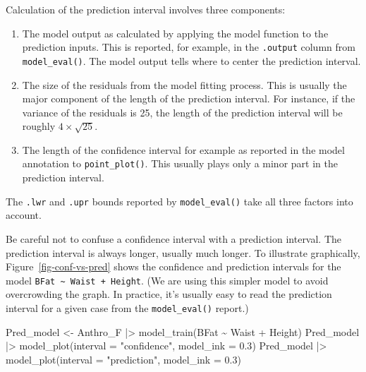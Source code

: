 \documentclass[
  letterpaper,
  DIV=11,
  numbers=noendperiod,
  oneside]{scrartcl}
\newenvironment{Shaded}{\begin{snugshade}}{\end{snugshade}}
\newcommand{\AttributeTok}[1]{\textcolor[rgb]{0.40,0.45,0.13}{#1}}
\newcommand{\FloatTok}[1]{\textcolor[rgb]{0.68,0.00,0.00}{#1}}
\newcommand{\FunctionTok}[1]{\textcolor[rgb]{0.28,0.35,0.67}{#1}}
\newcommand{\NormalTok}[1]{\textcolor[rgb]{0.00,0.23,0.31}{#1}}
\newcommand{\OtherTok}[1]{\textcolor[rgb]{0.00,0.23,0.31}{#1}}
\newcommand{\SpecialCharTok}[1]{\textcolor[rgb]{0.37,0.37,0.37}{#1}}
\newcommand{\StringTok}[1]{\textcolor[rgb]{0.13,0.47,0.30}{#1}}
\providecommand{\tightlist}{%
  \setlength{\itemsep}{0pt}\setlength{\parskip}{0pt}}\usepackage{longtable,booktabs,array}
\begin{document}
Calculation of the prediction interval involves three components:

\begin{enumerate}
\def\labelenumi{\arabic{enumi}.}
\tightlist
\item
  The model output as calculated by applying the model function to the
  prediction inputs. This is reported, for example, in the
  \texttt{.output} column from \texttt{model\_eval()}. The model output
  tells where to center the prediction interval.
\item
  The size of the residuals from the model fitting process. This is
  usually the major component of the length of the prediction interval.
  For instance, if the variance of the residuals is 25, the length of
  the prediction interval will be roughly \(4 \times \sqrt{25}\).
\item
  The length of the confidence interval for example as reported in the
  model annotation to \texttt{point\_plot()}. This usually plays only a
  minor part in the prediction interval.
\end{enumerate}

The \texttt{.lwr} and \texttt{.upr} bounds reported by
\texttt{model\_eval()} take all three factors into account.

Be careful not to confuse a confidence interval with a prediction
interval. The prediction interval is always longer, usually much longer.
To illustrate graphically, Figure~\ref{fig-conf-vs-pred} shows the
confidence and prediction intervals for the model
\texttt{BFat\ \textasciitilde{}\ Waist\ +\ Height}. (We are using this
simpler model to avoid overcrowding the graph. In practice, it's usually
easy to read the prediction interval for a given case from the
\texttt{model\_eval()} report.)

\begin{Shaded}
\begin{Highlighting}[]
\NormalTok{Pred\_model }\OtherTok{\textless{}{-}}\NormalTok{ Anthro\_F }\SpecialCharTok{|\textgreater{}} \FunctionTok{model\_train}\NormalTok{(BFat }\SpecialCharTok{\textasciitilde{}}\NormalTok{ Waist }\SpecialCharTok{+}\NormalTok{ Height)}
\NormalTok{Pred\_model }\SpecialCharTok{|\textgreater{}} \FunctionTok{model\_plot}\NormalTok{(}\AttributeTok{interval =} \StringTok{"confidence"}\NormalTok{, }\AttributeTok{model\_ink =} \FloatTok{0.3}\NormalTok{)}
\NormalTok{Pred\_model }\SpecialCharTok{|\textgreater{}} \FunctionTok{model\_plot}\NormalTok{(}\AttributeTok{interval =} \StringTok{"prediction"}\NormalTok{, }\AttributeTok{model\_ink =} \FloatTok{0.3}\NormalTok{)}
\end{Highlighting}
\end{Shaded}
\end{document}
